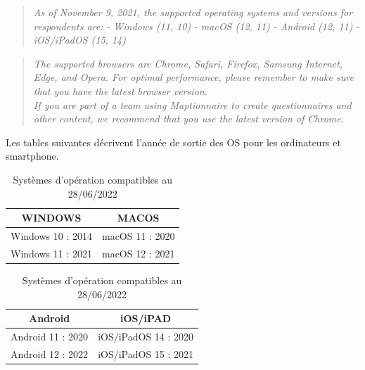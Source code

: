 \documentclass[
  12pt,
  a4paper,
]{scrbook}
\begin{document}
\begin{quote}
\emph{As of November 9, 2021, the supported operating systems and
versions for respondents are:} \emph{- Windows (11, 10)} \emph{- macOS
(12, 11)} \emph{- Android (12, 11)} \emph{- iOS/iPadOS (15, 14)}
\end{quote}

\begin{quote}
\emph{The supported browsers are Chrome, Safari, Firefox, Samsung
Internet, Edge, and Opera. For optimal performance, please remember to
make sure that you have the latest browser version.\\
If you are part of a team using Maptionnaire to create questionnaires
and other content, we recommend that you use the latest version of
Chrome.}
\end{quote}

Les tables suivantes décrivent l'année de sortie des OS pour les
ordinateurs et smartphone.

\begin{table}

\caption{\label{tbl-panel}Systèmes d'opération compatibles au
28/06/2022}\begin{minipage}[t]{0.50\linewidth}

{\centering 

\begin{tabular}[t]{cc}
\toprule
WINDOWS & MACOS\\
\midrule
Windows 10 : 2014 & macOS 11 : 2020\\
Windows 11 : 2021 & macOS 12 : 2021\\
\bottomrule
\end{tabular}

}

\end{minipage}%
%
\begin{minipage}[t]{0.50\linewidth}

{\centering 

\begin{tabular}[t]{cc}
\toprule
Android & iOS/iPAD\\
\midrule
Android 11 : 2020 & iOS/iPadOS 14 : 2020\\
Android 12 : 2022 & iOS/iPadOS 15 : 2021\\
\bottomrule
\end{tabular}

}

\end{minipage}%

\end{table}
\end{document}
